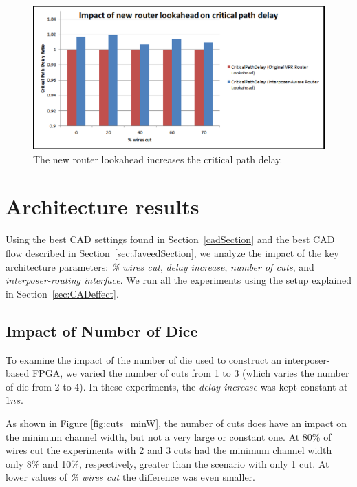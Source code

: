 \documentclass{sig-alternate-2013}
\begin{document}
\begin{figure}[!hb]
\centering
\includegraphics[width=\linewidth]{router_opt_fmax.eps}
\caption{The new router lookahead increases the critical path delay.}
\label{fig:lookahead_fmax}
\end{figure}

\section{Architecture results}
\label{resultsSection}

Using the best CAD settings found in Section~\ref{cadSection} and the best CAD flow described in Section~\ref{sec:JaveedSection}, we analyze the impact of the key architecture parameters: \textit{\% wires cut}, \textit{delay increase}, \textit{number of cuts}, and \textit{interposer-routing interface}. We run all the experiments using the setup explained in Section~\ref{sec:CADeffect}.

\subsection{Impact of Number of Dice}

To examine the impact of the number of die used to construct an interposer-based FPGA, we varied the number of cuts from 1 to 3 (which varies the number of die from 2 to 4).  In these experiments, the \textit{delay increase} was kept constant at $1ns$. 

As shown in Figure \ref{fig:cuts_minW}, the number of cuts does have an impact on the minimum channel width, but not a very large or constant one. At 80\% of wires cut the experiments with 2 and 3 cuts had the minimum channel width only 8\% and 10\%, respectively, greater than the scenario with only 1 cut. At lower values of \textit{\% wires cut} the difference was even smaller.
\end{document}
